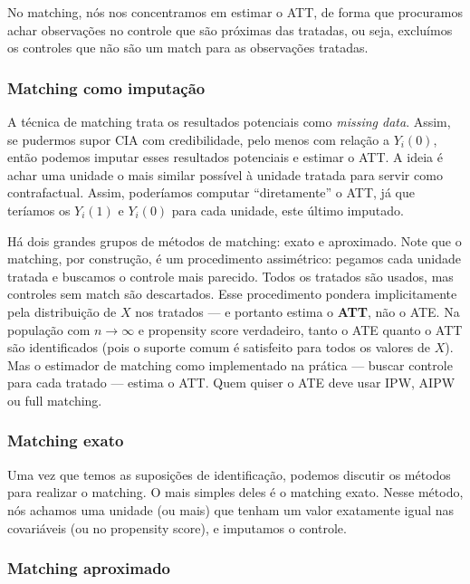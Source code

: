 \documentclass[
]{article}
\begin{document}
No matching, nós nos concentramos em estimar o ATT, de forma que procuramos achar observações no controle que são próximas das tratadas, ou seja, excluímos os controles que não são um match para as observações tratadas.

\subsubsection{Matching como imputação}\label{matching-como-imputauxe7uxe3o}

A técnica de matching trata os resultados potenciais como \emph{missing data}. Assim, se pudermos supor CIA com credibilidade, pelo menos com relação a \(Y_i(0)\), então podemos imputar esses resultados potenciais e estimar o ATT. A ideia é achar uma unidade o mais similar possível à unidade tratada para servir como contrafactual. Assim, poderíamos computar ``diretamente'' o ATT, já que teríamos os \(Y_i(1)\) e \(Y_i(0)\) para cada unidade, este último imputado.

Há dois grandes grupos de métodos de matching: exato e aproximado. Note que o matching, por construção, é um procedimento assimétrico: pegamos cada unidade tratada e buscamos o controle mais parecido. Todos os tratados são usados, mas controles sem match são descartados. Esse procedimento pondera implicitamente pela distribuição de \(X\) nos tratados --- e portanto estima o \textbf{ATT}, não o ATE. Na população com \(n \to \infty\) e propensity score verdadeiro, tanto o ATE quanto o ATT são identificados (pois o suporte comum é satisfeito para todos os valores de \(X\)). Mas o estimador de matching como implementado na prática --- buscar controle para cada tratado --- estima o ATT. Quem quiser o ATE deve usar IPW, AIPW ou full matching.

\subsubsection{Matching exato}\label{matching-exato}

Uma vez que temos as suposições de identificação, podemos discutir os métodos para realizar o matching. O mais simples deles é o matching exato. Nesse método, nós achamos uma unidade (ou mais) que tenham um valor exatamente igual nas covariáveis (ou no propensity score), e imputamos o controle.

\subsubsection{Matching aproximado}\label{matching-aproximado}
\end{document}
